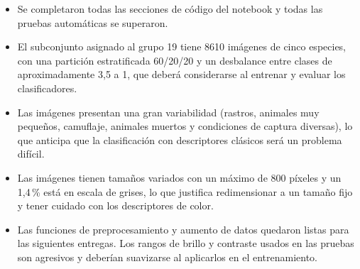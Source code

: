 \documentclass[11pt]{article}
\begin{document}
\begin{itemize}
  \item Se completaron todas las secciones de código del notebook y todas las pruebas automáticas se superaron.
  \item El subconjunto asignado al grupo 19 tiene 8610 imágenes de cinco especies, con una partición estratificada 60/20/20 y un desbalance entre clases de aproximadamente 3,5 a 1, que deberá considerarse al entrenar y evaluar los clasificadores.
  \item Las imágenes presentan una gran variabilidad (rastros, animales muy pequeños, camuflaje, animales muertos y condiciones de captura diversas), lo que anticipa que la clasificación con descriptores clásicos será un problema difícil.
  \item Las imágenes tienen tamaños variados con un máximo de 800 píxeles y un 1,4\,\% está en escala de grises, lo que justifica redimensionar a un tamaño fijo y tener cuidado con los descriptores de color.
  \item Las funciones de preprocesamiento y aumento de datos quedaron listas para las siguientes entregas. Los rangos de brillo y contraste usados en las pruebas son agresivos y deberían suavizarse al aplicarlos en el entrenamiento.
\end{itemize}
\end{document}
